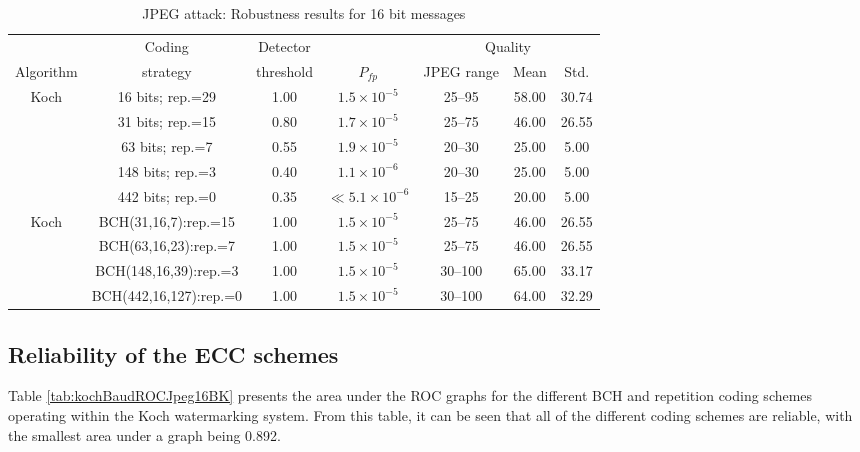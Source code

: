 \documentclass[12pt]{report}
\begin{document}
\begin{table}[htb]
\tiny
        \begin{center}
                \begin{tabular}{|c|c|c|c|c|c|c|} \hline
				& Coding     & Detector				& 		& \multicolumn{3}{c|}{Quality}	\\ \cline{5-7}	  
                Algorithm       & strategy   & threshold    			& $P_{fp}$      & JPEG range    & Mean & Std. \\\hline\hline
                Koch 	& 16 bits; rep.=29	     & 1.00    			& $1.5\times 10^{-5}$   & 25--95       & 58.00    & 30.74 \\ \cline{2-7}
                	& 31 bits; rep.=15      & 0.80     			& $1.7\times 10^{-5}$   & 25--75       & 46.00    & 26.55    \\ \cline{2-7}
                	& 63 bits; rep.=7       & 0.55     			& $1.9\times 10^{-5}$   & 20--30       & 25.00    & 5.00    \\ \cline{2-7}
                	& 148 bits; rep.=3      & 0.40     			& $1.1\times 10^{-6}$   & 20--30       & 25.00    & 5.00    \\ \cline{2-7}
                	& 442 bits; rep.=0      & 0.35     			& $\ll5.1\times 10^{-6}$& 15--25       & 20.00    & 5.00    \\ \hline\hline
		
		Koch 	& BCH(31,16,7):rep.=15  & 1.00	& $1.5\times 10^{-5}$				& 25--75		& 46.00	& 26.55	\\ \cline{2-7}
			& BCH(63,16,23):rep.=7  & 1.00	& $1.5\times 10^{-5}$				& 25--75		& 46.00	& 26.55	\\ \cline{2-7}
			& BCH(148,16,39):rep.=3 & 1.00	& $1.5\times 10^{-5}$				& 30--100	& 65.00	& 33.17	\\ \cline{2-7}
			& BCH(442,16,127):rep.=0& 1.00	& $1.5\times 10^{-5}$				& 30--100	& 64.00	& 32.29	\\ \hline
        \end{tabular}
        \caption{JPEG attack: Robustness results for 16 bit messages}
        \label{tab:jpgRobResBK}
        \end{center}
\end{table}
\normalsize


\subsection{Reliability of the ECC schemes} 
Table \ref{tab:kochBaudROCJpeg16BK} presents the area under the ROC graphs for the 
different BCH and repetition coding schemes operating within the Koch watermarking system.
From this table, it can be seen that all of the
different coding schemes are reliable, with the smallest area under a graph being 0.892.
\end{document}
